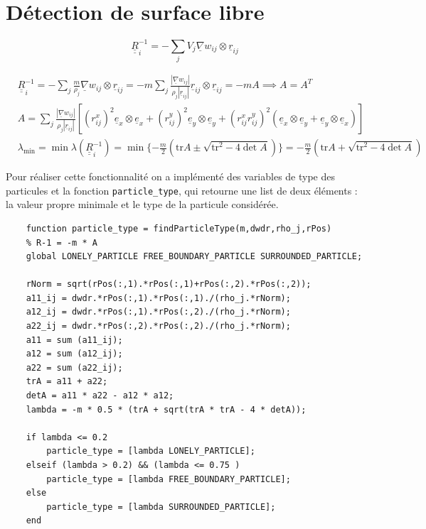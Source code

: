 \documentclass{article}
\newcommand\ul[1]{\underline{#1}}
\newcommand\uul[1]{\underline{\underline{#1}}}
\newcommand\uex{\ul{e}_x}
\newcommand\uey{\ul{e}_y}
\begin{document}
\section{Détection de surface libre}

\begin{equation}
	\uul{R}_i^{-1} = - \sum_{j} V_j \ul{\nabla} w_{ij} \otimes \ul{r}_{ij}
\end{equation}

\begin{align*}
	& \uul{R}_i^{-1} = - \sum_{j} \frac{m}{\rho_j} \ul{\nabla} w_{ij} \otimes \ul{r}_{ij} = - m \sum_{j} 
	\frac{| \ul{\nabla} w_{ij} |}{\rho_j |\ul{r}_{ij} |} \ul{r}_{ij} \otimes \ul{r}_{ij} = -m A \implies A = A^T \\
	& A = \sum_j \frac{| \ul{\nabla} w_{ij} |}{\rho_j |\ul{r}_{ij} |} \left[ (r_{ij}^x)^2 \uex \otimes \uex + (r_{ij}^y)^2 \uey \otimes \uey + (r_{ij}^x r_{ij}^y)^2 (\uex \otimes \uey + \uey \otimes \uex) \right] \\ 
	& \lambda_{\min} = \min\lambda(\uul{R}_i^{-1}) = \min\{ -\frac{m}{2} (\mathrm{tr} A \pm \sqrt{\mathrm{tr}^2 - 4 \det A}) \} = -\frac{m}{2} (\mathrm{tr} A + \sqrt{\mathrm{tr}^2 - 4 \det A})
\end{align*}

Pour réaliser cette fonctionnalité on a implémenté des variables de type des particules et la fonction \lstinline$particle_type$, qui retourne une list de deux éléments : la valeur propre minimale et le type de la particule considérée.  
\lstset{language=matlab}   
\begin{lstlisting}           
	function particle_type = findParticleType(m,dwdr,rho_j,rPos)
    % R-1 = -m * A 
    global LONELY_PARTICLE FREE_BOUNDARY_PARTICLE SURROUNDED_PARTICLE;

    rNorm = sqrt(rPos(:,1).*rPos(:,1)+rPos(:,2).*rPos(:,2)); 
    a11_ij = dwdr.*rPos(:,1).*rPos(:,1)./(rho_j.*rNorm); 
    a12_ij = dwdr.*rPos(:,1).*rPos(:,2)./(rho_j.*rNorm); 
    a22_ij = dwdr.*rPos(:,2).*rPos(:,2)./(rho_j.*rNorm); 
    a11 = sum (a11_ij);
    a12 = sum (a12_ij);
    a22 = sum (a22_ij);
    trA = a11 + a22;
    detA = a11 * a22 - a12 * a12;
    lambda = -m * 0.5 * (trA + sqrt(trA * trA - 4 * detA));

    if lambda <= 0.2 
        particle_type = [lambda LONELY_PARTICLE];
    elseif (lambda > 0.2) && (lambda <= 0.75 ) 
        particle_type = [lambda FREE_BOUNDARY_PARTICLE];
    else 
        particle_type = [lambda SURROUNDED_PARTICLE];
    end
\end{lstlisting} 
\end{document}
